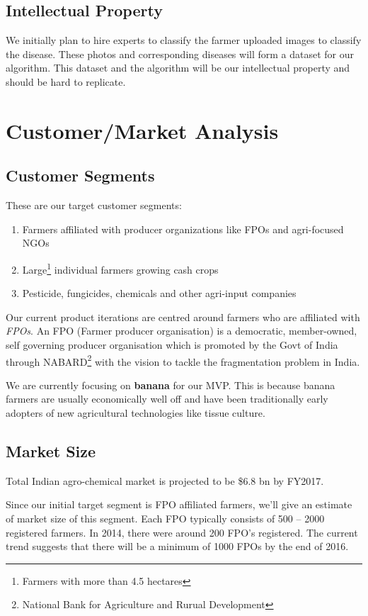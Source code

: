 \documentclass[a4paper]{article}
\begin{document}
\subsection{Intellectual Property}
We initially plan to hire experts to classify the farmer uploaded images to classify the disease.
These photos and corresponding diseases will form a dataset for our algorithm.
This dataset and the algorithm will be our intellectual property and should be hard to replicate.


\section{Customer/Market Analysis}
\subsection{Customer Segments}
These are our target customer segments: 

\begin{enumerate}
\item Farmers affiliated with producer organizations like FPOs and agri-focused NGOs
\item Large\footnote{Farmers with more than 4.5 hectares} individual farmers growing cash crops
\item Pesticide, fungicides, chemicals and other agri-input companies
\end{enumerate}

Our current product iterations are centred around farmers who are affiliated with \emph{FPOs}. An FPO (Farmer producer organisation) is a democratic, member-owned, self governing producer organisation which is promoted by the Govt of India through NABARD\footnote{National Bank for Agriculture and Rurual Development} with the vision to tackle the fragmentation problem in India.

We are currently focusing on \textbf{banana} for our MVP. This is because banana farmers are usually economically well off and have been traditionally early adopters of new agricultural technologies like tissue culture.


\subsection{Market Size}
Total Indian agro-chemical market is projected to be \$6.8 bn by FY2017. 

Since our initial target segment is FPO affiliated farmers, we'll give an estimate of market size of this segment. Each FPO typically consists of 500 -- 2000 registered farmers. In 2014, there were around 200 FPO's registered. The current trend suggests that there will be a minimum of 1000 FPOs by the end of 2016.
\end{document}

